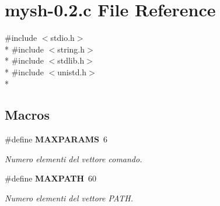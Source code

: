 \section{mysh-\/0.2.c File Reference}
\label{mysh-0_82_8c}
{\ttfamily \#include $<$stdio.\+h$>$}\\*
{\ttfamily \#include $<$string.\+h$>$}\\*
{\ttfamily \#include $<$stdlib.\+h$>$}\\*
{\ttfamily \#include $<$unistd.\+h$>$}\\*
\subsection*{Macros}
\begin{DoxyCompactItemize}
\item 
\#define {\bf M\+A\+X\+P\+A\+R\+A\+MS}~6
\begin{DoxyCompactList}\small\item\em Numero elementi del vettore comando. \end{DoxyCompactList}\item 
\#define {\bf M\+A\+X\+P\+A\+TH}~60
\begin{DoxyCompactList}\small\item\em Numero elementi del vettore P\+A\+TH. \end{DoxyCompactList}\end{DoxyCompactItemize}
